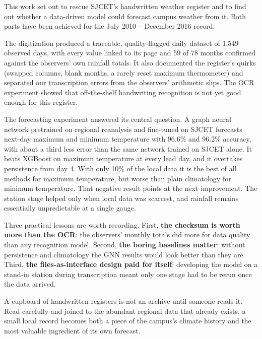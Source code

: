 This work set out to rescue SJCET's handwritten weather register and to find out whether a data-driven model could forecast campus weather from it. Both parts have been achieved for the July 2010 -- December 2016 record.

The digitization produced a traceable, quality-flagged daily dataset of 1,549 observed days, with every value linked to its page and 59 of 78 months confirmed against the observers' own rainfall totals. It also documented the register's quirks (swapped columns, blank months, a rarely reset maximum thermometer) and separated our transcription errors from the observers' arithmetic slips. The OCR experiment showed that off-the-shelf handwriting recognition is not yet good enough for this register.

The forecasting experiment answered its central question. A graph neural network pretrained on regional reanalysis and fine-tuned on SJCET forecasts next-day maximum and minimum temperature with 96.6\% and 96.2\% accuracy, with about a third less error than the same network trained on SJCET alone. It beats XGBoost on maximum temperature at every lead day, and it overtakes persistence from day 4. With only 10\% of the local data it is the best of all methods for maximum temperature, but worse than plain climatology for minimum temperature. That negative result points at the next improvement. The station stage helped only when local data was scarcest, and rainfall remains essentially unpredictable at a single gauge.

Three practical lessons are worth recording. First, \textbf{the checksum is worth more than the OCR}: the observers' monthly totals did more for data quality than any recognition model. Second, \textbf{the boring baselines matter}: without persistence and climatology the GNN results would look better than they are. Third, \textbf{the files-as-interface design paid for itself}: developing the model on a stand-in station during transcription meant only one stage had to be rerun once the data arrived.

A cupboard of handwritten registers is not an archive until someone reads it. Read carefully and joined to the abundant regional data that already exists, a small local record becomes both a piece of the campus's climate history and the most valuable ingredient of its own forecast.
